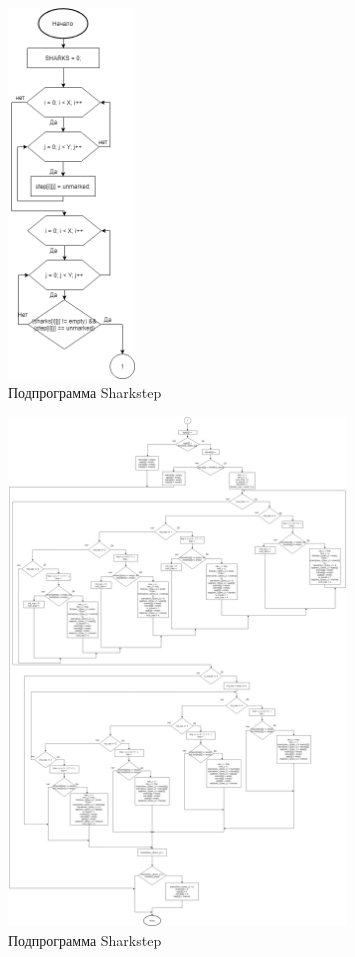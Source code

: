 \documentclass[14pt]{extarticle}
\begin{document}
\newpage
\begin{figure}[!h]
  \centering
  \includegraphics[width=0.3\textwidth]{sharkstepTEST2.png}
  \caption{Подпрограмма Sharkstep\label{second}}
\end{figure}
\newpage
\begin{figure}[!h]
  \centering
  \includegraphics[width=0.8\textwidth]{sharkstepTEST.png}
  \caption{Подпрограмма Sharkstep\label{second}}
\end{figure}
\end{document}
